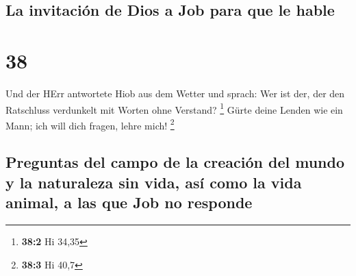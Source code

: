 \hypertarget{la-invitaciuxf3n-de-dios-a-job-para-que-le-hable}{%
\subsection{La invitación de Dios a Job para que le
hable}\label{la-invitaciuxf3n-de-dios-a-job-para-que-le-hable}}

\hypertarget{section-37}{%
\section{38}\label{section-37}}

 Und der HErr antwortete Hiob aus dem Wetter und sprach:
 Wer ist der, der den Ratschluss verdunkelt mit Worten
ohne Verstand? \footnote{\textbf{38:2} Hi 34,35}  Gürte
deine Lenden wie ein Mann; ich will dich fragen, lehre mich! \footnote{\textbf{38:3}
  Hi 40,7}

\hypertarget{preguntas-del-campo-de-la-creaciuxf3n-del-mundo-y-la-naturaleza-sin-vida-asuxed-como-la-vida-animal-a-las-que-job-no-responde}{%
\subsection{Preguntas del campo de la creación del mundo y la naturaleza
sin vida, así como la vida animal, a las que Job no
responde}\label{preguntas-del-campo-de-la-creaciuxf3n-del-mundo-y-la-naturaleza-sin-vida-asuxed-como-la-vida-animal-a-las-que-job-no-responde}}

